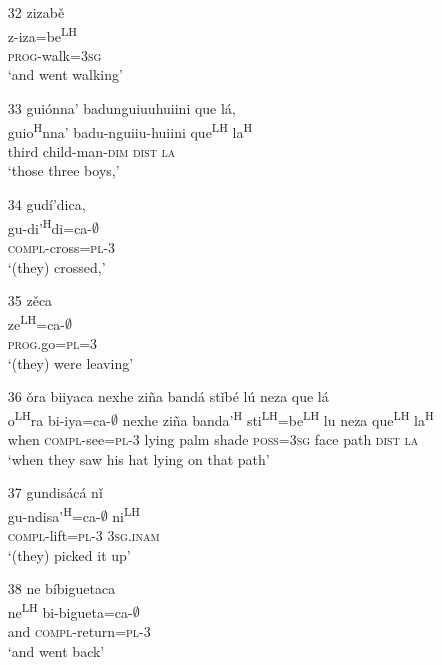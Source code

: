\begin{itemize}
\item[32]
\glll zizab\v{e}\\
z-iza=be\textsuperscript{LH}\\
\textsc{prog}-walk=\textsc{3sg}\\
\glt `and went walking'


\item[33]
\glll gui\'{o}nna' badunguiuuhuiini que l\'{a},\\
guio\textsuperscript{H}nna' badu-nguiiu-huiini que\textsuperscript{LH} la\textsuperscript{H}\\
third child-man-\textsc{dim} \textsc{dist} \textsc{la}\\
\glt `those three boys,'


\item[34]
\glll gud\'{i}'dica,\\
gu-di'\textsuperscript{H}di=ca-$\emptyset$\\
\textsc{compl}-cross=\textsc{pl}-\textsc{3}\\
\glt `(they) crossed,'


\item[35]
\glll z\v{e}ca\\
ze\textsuperscript{LH}=ca-$\emptyset$\\
\textsc{prog}.go=\textsc{pl}=\textsc{3}\\
\glt `(they) were leaving'
 

\item[36]
\glll \v{o}ra biiyaca nexhe zi\~{n}a band\'{a} st\v{i}b\'{e} l\'{u} neza que l\'{a}\\
o\textsuperscript{LH}ra bi-iya=ca-$\emptyset$ nexhe zi\~{n}a banda'\textsuperscript{H} sti\textsuperscript{LH}=be\textsuperscript{LH} lu neza que\textsuperscript{LH} la\textsuperscript{H}\\
when \textsc{compl}-see=\textsc{pl}-\textsc{3} lying palm shade \textsc{poss}=\textsc{3sg} face path \textsc{dist} \textsc{la}\\
\glt `when they saw his hat lying on that path'


\item[37]
\glll gundis\'{a}c\'{a} n\v{i}\\
gu-ndisa'\textsuperscript{H}=ca-$\emptyset$ ni\textsuperscript{LH}\\
\textsc{compl}-lift=\textsc{pl}-\textsc{3} \textsc{3sg.inam}\\
\glt `(they) picked it up'


\item[38]
\glll ne b\'{i}biguetaca\\
ne\textsuperscript{LH} bi-bigueta=ca-$\emptyset$\\
and \textsc{compl}-return=\textsc{pl}-\textsc{3}\\
\glt `and went back'



\end{itemize}
